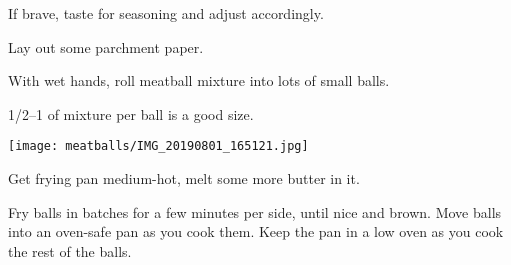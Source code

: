 \begin{recipe}
{		\step If brave, taste for seasoning and adjust accordingly.

		\step Lay out some parchment paper.

		\vspace{1em}

		\step With wet hands, roll meatball mixture into lots of small balls.

		\vspace{1em}

		\SIrange{1/2}{1}{\tablespoon} of mixture per ball is a good size.

		\texttt{[image: meatballs/IMG\_20190801\_165121.jpg]}

		\step Get frying pan medium-hot, melt some more butter in it.

		\vspace{1em}

		\step Fry balls in batches for a few minutes per side, until nice and brown. Move balls into an oven-safe pan as you cook them. Keep the pan in a low oven as you cook the rest of the balls.
	}

\end{recipe}